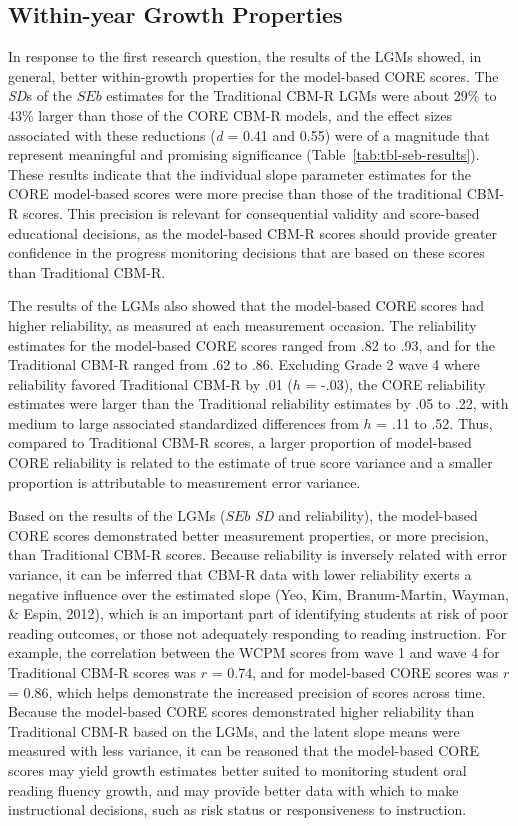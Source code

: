 \documentclass[
  english,
  man, fleqn, noextraspace]{apa6}
\begin{document}
\hypertarget{within-year-growth-properties}{%
\subsection{Within-year Growth Properties}\label{within-year-growth-properties}}

In response to the first research question, the results of the LGMs showed, in general, better within-growth properties for the model-based CORE scores. The \emph{SD}s of the \(SEb\) estimates for the Traditional CBM-R LGMs were about 29\% to 43\% larger than those of the CORE CBM-R models, and the effect sizes associated with these reductions (\emph{d} = 0.41 and 0.55) were of a magnitude that represent meaningful and promising significance (Table~\ref{tab:tbl-seb-results}). These results indicate that the individual slope parameter estimates for the CORE model-based scores were more precise than those of the traditional CBM-R scores. This precision is relevant for consequential validity and score-based educational decisions, as the model-based CBM-R scores should provide greater confidence in the progress monitoring decisions that are based on these scores than Traditional CBM-R.

The results of the LGMs also showed that the model-based CORE scores had higher reliability, as measured at each measurement occasion. The reliability estimates for the model-based CORE scores ranged from .82 to .93, and for the Traditional CBM-R ranged from .62 to .86. Excluding Grade 2 wave 4 where reliability favored Traditional CBM-R by .01 (\(h\) = -.03), the CORE reliability estimates were larger than the Traditional reliability estimates by .05 to .22, with medium to large associated standardized differences from \(h\) = .11 to .52. Thus, compared to Traditional CBM-R scores, a larger proportion of model-based CORE reliability is related to the estimate of true score variance and a smaller proportion is attributable to measurement error variance.

Based on the results of the LGMs (\(SEb\) \emph{SD} and reliability), the model-based CORE scores demonstrated better measurement properties, or more precision, than Traditional CBM-R scores. Because reliability is inversely related with error variance, it can be inferred that CBM-R data with lower reliability exerts a negative influence over the estimated slope (Yeo, Kim, Branum-Martin, Wayman, \& Espin, 2012), which is an important part of identifying students at risk of poor reading outcomes, or those not adequately responding to reading instruction. For example, the correlation between the WCPM scores from wave 1 and wave 4 for Traditional CBM-R scores was \(r\) = 0.74, and for model-based CORE scores was \(r\) = 0.86, which helps demonstrate the increased precision of scores across time. Because the model-based CORE scores demonstrated higher reliability than Traditional CBM-R based on the LGMs, and the latent slope means were measured with less variance, it can be reasoned that the model-based CORE scores may yield growth estimates better suited to monitoring student oral reading fluency growth, and may provide better data with which to make instructional decisions, such as risk status or responsiveness to instruction.
\end{document}
